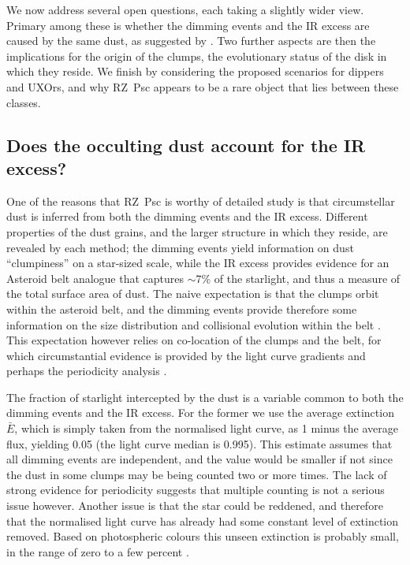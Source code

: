 \documentclass[useAMS,usenatbib,usegraphicx]{mn2e}
\begin{document}
We now address several open questions, each taking a slightly wider view. Primary among
these is whether the dimming events and the IR excess are caused by the same dust, as
suggested by \citet{2013A&A...553L...1D}. Two further aspects are then the implications
for the origin of the clumps, the evolutionary status of the disk in which they
reside. We finish by considering the proposed scenarios for dippers and UXOrs, and why
RZ~Psc appears to be a rare object that lies between these classes.

\subsection{Does the occulting dust account for the IR excess?}\label{ss:ir}

One of the reasons that RZ~Psc is worthy of detailed study is that circumstellar dust is
inferred from both the dimming events and the IR excess. Different properties of the dust
grains, and the larger structure in which they reside, are revealed by each method; the
dimming events yield information on dust ``clumpiness'' on a star-sized scale, while the
IR excess provides evidence for an Asteroid belt analogue that captures $\sim$7\% of the
starlight, and thus a measure of the total surface area of dust. The naive expectation is
that the clumps orbit within the asteroid belt, and the dimming events provide therefore
some information on the size distribution and collisional evolution within the belt
\citep{2013A&A...553L...1D}. This expectation however relies on co-location of the clumps
and the belt, for which circumstantial evidence is provided by the light curve gradients
and perhaps the periodicity analysis \citep[see also][]{2010A&A...524A...8G}.

The fraction of starlight intercepted by the dust is a variable common to both the
dimming events and the IR excess. For the former we use the average extinction $\bar{E}$,
which is simply taken from the normalised light curve, as 1 minus the average flux,
yielding 0.05 (the light curve median is 0.995). This estimate assumes that all dimming
events are independent, and the value would be smaller if not since the dust in some
clumps may be being counted two or more times. The lack of strong evidence for
periodicity suggests that multiple counting is not a serious issue however. Another issue
is that the star could be reddened, and therefore that the normalised light curve has
already had some constant level of extinction removed. Based on photospheric colours this
unseen extinction is probably small, in the range of zero to a few percent
\citep{2000ARep...44..611K}.
\end{document}
